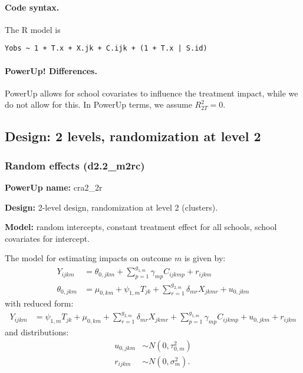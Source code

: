 \documentclass[12pt]{article}
\begin{document}
\paragraph{Code syntax.}
The R model is
\begin{verbatim}
Yobs ~ 1 + T.x + X.jk + C.ijk + (1 + T.x | S.id)
\end{verbatim}

\paragraph{PowerUp! Differences.}
PowerUp allows for school covariates to influence the treatment impact, while we do not allow for this. In PowerUp terms, we assume $R^2_{2T} = 0$.



\newpage 
\subsection{Design: 2 levels, randomization at level 2}


\subsubsection{Random effects (d2.2\_m2rc)}

\textbf{PowerUp name:} cra2\_2r


\textbf{Design:} 2-level design, randomization at level 2 (clusters).

\textbf{Model:} random intercepts, constant treatment effect for all schools, school covariates for intercept.

The model for estimating impacts on outcome $m$ is given by:
\begin{align}
Y_{ijkm} &=  \theta_{0,jkm} + \sum_{p=1}^{g_{1,m}} \gamma_{mp} C_{ijkmp} + r_{ijkm}\\
\nonumber \theta_{0,jkm} &= \mu_{0,km} + \psi_{1,m} T_{jk} + \sum_{r=1}^{g_{2,m}} \delta_{mr} X_{jkmr} + u_{0,jkm}
\end{align}
with reduced form:
\begin{align}
Y_{ijkm} &= \psi_{1,m} T_{jk} + \mu_{0,km} + \sum_{r=1}^{g_{2,m}} \delta_{mr} X_{jkmr} + \sum_{p=1}^{g_{1,m}} \gamma_{mp} C_{ijkmp} + u_{0,jkm} + r_{ijkm}
\end{align}
and distributions:
\begin{align}
u_{0,jkm} &\sim N\left(0, \tau^2_{0,m}\right)\\
\nonumber r_{ijkm} &\sim N\left(0, \sigma^2_m\right).
\end{align}
\end{document}
